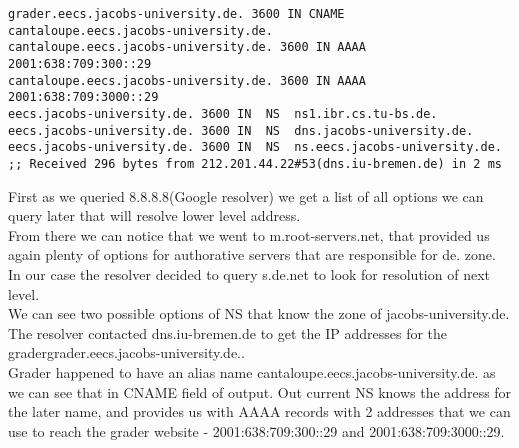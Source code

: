 \documentclass[a4paper]{article}
\begin{document}
\begin{verbatim}
grader.eecs.jacobs-university.de. 3600 IN CNAME	cantaloupe.eecs.jacobs-university.de.
cantaloupe.eecs.jacobs-university.de. 3600 IN AAAA 2001:638:709:300::29
cantaloupe.eecs.jacobs-university.de. 3600 IN AAAA 2001:638:709:3000::29
eecs.jacobs-university.de. 3600	IN	NS	ns1.ibr.cs.tu-bs.de.
eecs.jacobs-university.de. 3600	IN	NS	dns.jacobs-university.de.
eecs.jacobs-university.de. 3600	IN	NS	ns.eecs.jacobs-university.de.
;; Received 296 bytes from 212.201.44.22#53(dns.iu-bremen.de) in 2 ms
\end{verbatim}
First as we queried 8.8.8.8(Google resolver) we get a list of all options we can query later that will resolve lower level address.\\
From there we can notice that we went to m.root-servers.net, that provided us again plenty of options for authorative servers that are responsible for de. zone.\\
In our case the resolver decided to query s.de.net to look for resolution of next level.\\
We can see two possible options of NS that know the zone of jacobs-university.de.\\
The resolver contacted dns.iu-bremen.de to get the IP addresses for the gradergrader.eecs.jacobs-university.de..\\
Grader happened to have an alias name cantaloupe.eecs.jacobs-university.de.
 as we can see that in CNAME field of output. Out current NS knows the address for the later name, and provides us with AAAA records with 2 addresses that we can use to reach the grader website - 2001:638:709:300::29 and 2001:638:709:3000::29.\\
 
\end{document}
